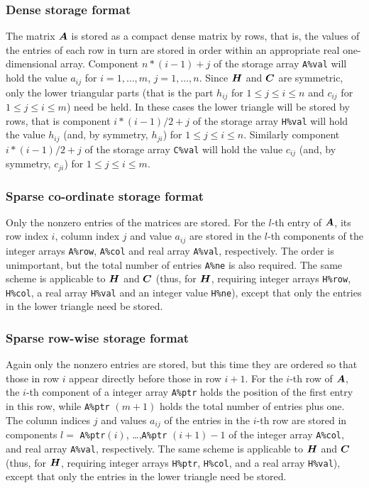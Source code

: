 \documentclass{galahad}
\begin{document}
\subsubsection{Dense storage format}\label{dense}
The matrix ${\bm{A}}$ is stored as a compact
dense matrix by rows, that is, the values of the entries of each row in turn are
stored in order within an appropriate real one-dimensional array.
Component $n \ast (i-1) + j$ of the storage array {\tt A\%val} will hold the
value $a_{ij}$ for $i = 1, \ldots , m$, $j = 1, \ldots , n$.
Since ${\bm{H}}$ and ${\bm{C}}$ are symmetric, only the lower triangular parts
(that is the part $h_{ij}$ for $1 \leq j \leq i \leq n$ and
$c_{ij}$ for $1 \leq j \leq i \leq m$) need be held. In these cases
the lower triangle will be stored by rows, that is
component $i \ast (i-1)/2 + j$ of the storage array {\tt H\%val}
will hold the value $h_{ij}$ (and, by symmetry, $h_{ji}$)
for $1 \leq j \leq i \leq n$. Similarly
component $i \ast (i-1)/2 + j$ of the storage array {\tt C\%val}
will hold the value $c_{ij}$ (and, by symmetry, $c_{ji}$)
for $1 \leq j \leq i \leq m$.

\subsubsection{Sparse co-ordinate storage format}\label{coordinate}
Only the nonzero entries of the matrices are stored. For the
$l$-th entry of ${\bm{A}}$, its row index $i$, column index $j$
and value $a_{ij}$
are stored in the $l$-th components of the integer arrays {\tt A\%row},
{\tt A\%col} and real array {\tt A\%val}, respectively.
The order is unimportant, but the total
number of entries {\tt A\%ne} is also required.
The same scheme is applicable to ${\bm{H}}$ and ${\bm{C}}$
(thus, for ${\bm{H}}$, requiring integer arrays {\tt H\%row}, {\tt H\%col}, a real
array  {\tt H\%val} and an integer value {\tt H\%ne}),
except that only the entries in the lower triangle need be stored.

\subsubsection{Sparse row-wise storage format}\label{rowwise}
Again only the nonzero entries are stored, but this time
they are ordered so that those in row $i$ appear directly before those
in row $i+1$. For the $i$-th row of ${\bm{A}}$, the $i$-th component of a
integer array {\tt A\%ptr} holds the position of the first entry in this row,
while {\tt A\%ptr} $(m+1)$ holds the total number of entries plus one.
The column indices $j$ and values $a_{ij}$ of the entries in the $i$-th row
are stored in components
$l =$ {\tt A\%ptr}$(i)$, \ldots ,{\tt A\%ptr} $(i+1)-1$ of the
integer array {\tt A\%col}, and real array {\tt A\%val}, respectively.
The same scheme is applicable to
${\bm{H}}$ and ${\bm{C}}$ (thus, for ${\bm{H}}$,
requiring integer arrays {\tt H\%ptr}, {\tt H\%col}, and
a real array {\tt H\%val}),
except that only the entries in the lower triangle need be stored.
\end{document}
